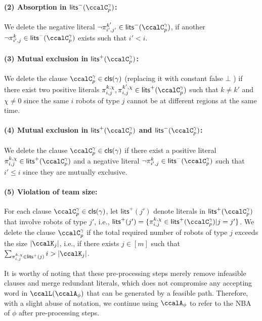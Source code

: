 \documentclass[Afour,sageh,times]{sagej}
\newcommand{\clause}[1]{\mathsf{cls}(#1)}
\newcommand{\cp}[2]{\ccalC_{#1}^{#2}}
\newcommand{\autop}{\ccalA_{\phi}}
\renewcommand{\ap}[3]{\mathcal{\pi}_{{#1},{#2}}^{#3}}
\begin{document}
 \paragraph{(2) Absorption in $\mathsf{lits}^-(\cp{p}{\gamma})$:} \label{prune:absorption2} We delete the negative literal $\neg \ap{i'}{j'}{k'} \in \mathsf{lits}^-(\cp{p}{\gamma})$, if another $\neg \ap{i'}{j}{k} \in \mathsf{lits}^-(\cp{p}{\gamma})$ exists such that $i' < i$.
\paragraph{(3) Mutual exclusion in $\mathsf{lits}^+(\cp{p}{\gamma})$:}\label{prune:exclusion1} We delete the clause $\cp{p}{\gamma} \in \mathsf{cls}(\gamma)$ (replacing it with constant false $\bot$ ) if there exist two positive literals $\ap{i}{j}{k,\chi}, \ap{i}{j}{k',\chi} \in \mathsf{lits}^+(\cp{p}{\gamma})$ such that $k\not= k'$ and $\chi\not=0$ since the same $i$ robots of type $j$  cannot be at different regions at the same time.
 \paragraph{(4) Mutual exclusion in $\mathsf{lits}^+(\cp{p}{\gamma})$  and $\mathsf{lits}^-(\cp{p}{\gamma})$:} \label{prune:exclusion2} We delete the clause $\cp{p}{\gamma} \in \mathsf{cls}(\gamma)$  if there exist a positive literal $\ap{i}{j}{k,\chi} \in \mathsf{lits}^+(\cp{p}{\gamma})$ and a negative literal $\neg \ap{i'}{j}{k} \in \mathsf{lits}^-(\cp{p}{\gamma})$ such that $i' \leq i$ since they are mutually  exclusive.
 \paragraph{(5) Violation of team size:} \label{prune:violation1}  For each clause $\cp{p}{\gamma} \in \clause{\gamma}$, let $\mathsf{lits}^+(j')$ denote literals in $\mathsf{lits}^+(\cp{p}{\gamma})$ that involve robots of type $j'$, i.e., $\mathsf{lits}^+(j') = \{\ap{i}{j}{k,\chi} \in \mathsf{lits}^+(\ccalC_p^\gamma)| j = j'\}$. We delete the clause $\cp{p}{\gamma}$   if the total required number of robots of type $j$ exceeds the size $|\ccalK_j|$, i.e., if there exists $j\in[m]$ such that $ \sum_{\ap{i}{j}{k,\chi}\in\mathsf{lits}^+(j)}   i > |\ccalK_{j}|$.

       It is worthy of noting that these pre-processing steps  merely  remove infeasible clauses and merge redundant literals, which does not compromise any accepting word in $\ccalL(\autop)$ that can be generated by a feasible path. Therefore, with a slight abuse of notation, we continue using $\autop$ to refer to the NBA of $\phi$ after pre-processing steps.
\end{document}
